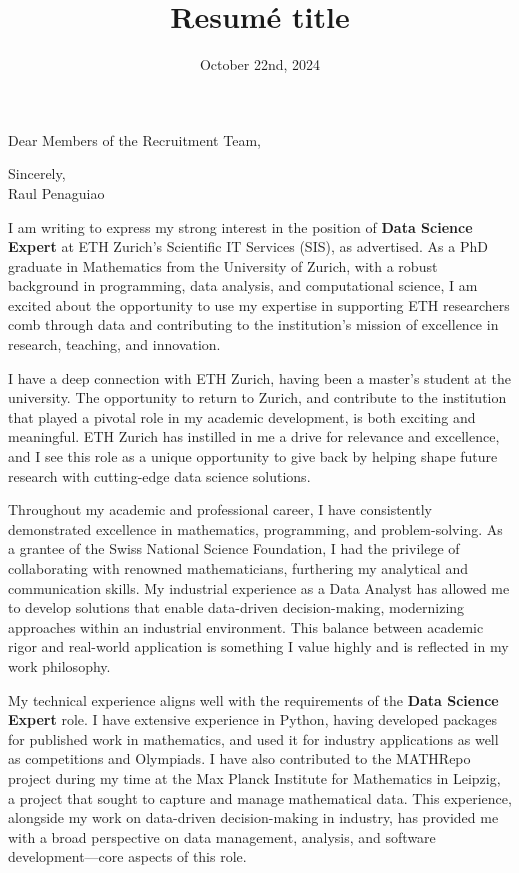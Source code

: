 \documentclass[11pt,a4paper,sans]{moderncv}
\title{Resumé title}
\begin{document}
\date{October 22nd, 2024}
\opening{Dear Members of the Recruitment Team,}
\closing{
Sincerely, \\
Raul Penaguiao}

\makelettertitle

\justify
I am writing to express my strong interest in the position of \textbf{Data Science Expert} at ETH Zurich’s Scientific IT Services (SIS), as advertised. As a PhD graduate in Mathematics from the University of Zurich, with a robust background in programming, data analysis, and computational science, I am excited about the opportunity to use my expertise in supporting ETH researchers comb through data and contributing to the institution’s mission of excellence in research, teaching, and innovation.

I have a deep connection with ETH Zurich, having been a master's student at the university. The opportunity to return to Zurich, and contribute to the institution that played a pivotal role in my academic development, is both exciting and meaningful. ETH Zurich has instilled in me a drive for relevance and excellence, and I see this role as a unique opportunity to give back by helping shape future research with cutting-edge data science solutions.

Throughout my academic and professional career, I have consistently demonstrated excellence in mathematics, programming, and problem-solving. As a grantee of the Swiss National Science Foundation, I had the privilege of collaborating with renowned mathematicians, furthering my analytical and communication skills. My industrial experience as a Data Analyst has allowed me to develop solutions that enable data-driven decision-making, modernizing approaches within an industrial environment. This balance between academic rigor and real-world application is something I value highly and is reflected in my work philosophy.

My technical experience aligns well with the requirements of the \textbf{Data Science Expert} role. I have extensive experience in Python, having developed packages for published work in mathematics, and used it for industry applications as well as competitions and Olympiads. I have also contributed to the MATHRepo project during my time at the Max Planck Institute for Mathematics in Leipzig, a project that sought to capture and manage mathematical data. This experience, alongside my work on data-driven decision-making in industry, has provided me with a broad perspective on data management, analysis, and software development—core aspects of this role.
\end{document}
